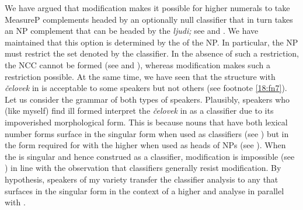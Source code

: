 \documentclass[output=paper,modfonts,newtxmath,hidelinks]{langscibook}
\begin{document}
We have argued that modification makes it possible for higher numerals to take MeasureP complements headed by an optionally null classifier that in turn takes an NP complement that can be headed by the  \textit{ljudi;} see  and . We have maintained that this option is determined by the  of the NP. In particular, the NP must restrict the set denoted by the classifier. In the absence of such a restriction, the NCC cannot be formed (see  and ), whereas modification makes such a restriction possible. At the same time, we have seen that the structure with \textit{čelovek} in  is acceptable to some speakers but not others (see footnote \ref{18:fn7}). Let us consider the grammar of both types of speakers. Plausibly, speakers who (like myself) find  ill formed interpret the  \textit{čelovek} in  as a classifier due to its impoverished morphological form. This is because nouns that have both lexical number forms surface in the  singular form when used as classifiers (see ) but in the   form required for  with the higher  when used as heads of NPs (see ). When the  is  singular and hence construed as a classifier, modification is impossible (see ) in line with the observation that classifiers generally resist modification. By hypothesis, speakers of my variety transfer the classifier analysis to any  that surfaces in the  singular form in the context of a higher  and analyse  in parallel with .
\ea \label{18:ex18}
	\z
\z
\largerpage[-2]
\end{document}
